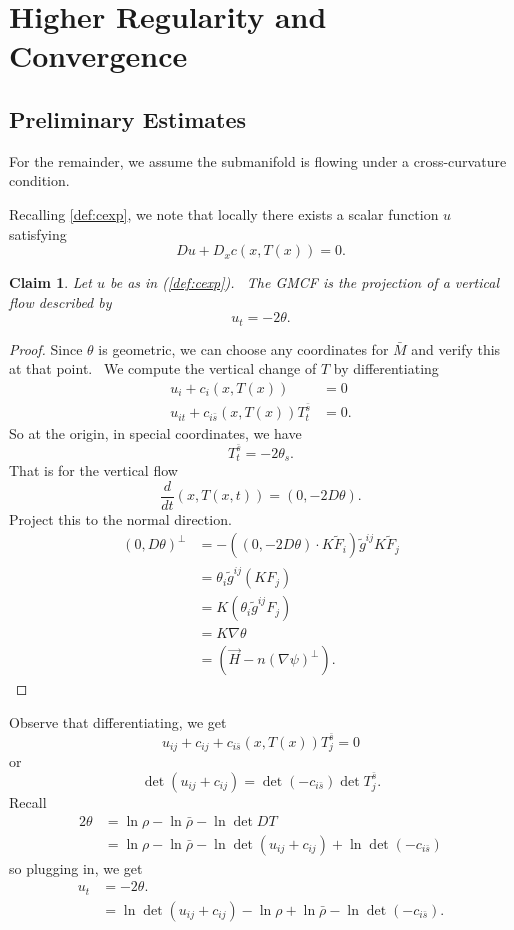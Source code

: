 \documentclass[12pt,letterpaper]{amsart}%
\newcounter{mycounter}
\numberwithin{mycounter}{section}
\theoremstyle{plain}
\newtheorem{claim}[mycounter]{Claim}
\numberwithin{equation}{section}
\theoremstyle{definition}
\begin{document}
\section{Higher Regularity and Convergence } 

\subsection{Preliminary Estimates}

For the remainder, we assume the submanifold is flowing under a cross-curvature condition.  

Recalling \eqref{def:cexp}, we note that locally there exists a scalar function $u$ satisfying
\[
Du + D_x c(x,T(x)) = 0.
\]


\begin{claim}
Let $u$ be as in (\ref{def:cexp}). \ The GMCF is the projection of a
vertical flow described by
\[
u_{t}=-2\theta.
\]

\end{claim}

\begin{proof}
Since $\theta$ is geometric, we can choose any coordinates for $\bar{M}$ and
verify this at that point. \ We compute the vertical change of $T$ by
differentiating \
\begin{align*}
u_{i}+c_{i}(x,T(x))  & =0\\
u_{it}+c_{i\bar{s}}(x,T(x))T_{t}^{\bar{s}}  & =0.
\end{align*}
So at the origin, in special coordinates, we have
\[
T_{t}^{\bar{s}}=-2\theta_{s}.
\]
That is for the vertical flow
\[
\frac{d}{dt}(x,T(x,t))=(0,-2D\theta).
\]
Project this to the normal direction. \
\begin{align*}
(0,D\theta)^{\perp}  & =-\left(  (0,-2D\theta)\cdot K\tilde{F}_{i}\right)
\tilde{g}^{ij}K\tilde{F}_{j}\\
& =\theta_{i}\tilde{g}^{ij}(KF_{j})\\
& =K\left(  \theta_{i}\tilde{g}^{ij}F_{j}\right)  \\
& =K\nabla\theta\\
& =(\vec{H}-n\left(  \nabla\psi\right)  ^{\perp}).
\end{align*}

\end{proof}

Observe that differentiating, we get
\begin{equation}
u_{ij}+c_{ij}+c_{i\bar{s}}(x,T(x))T_{j}^{\bar{s}}=0 \label{c2c1}
\end{equation}
or
\[
\det(u_{ij}+c_{ij})=\det(-c_{i\bar{s}})\det T_{j}^{\bar{s}}.
\]
Recall
\begin{align*}
2\theta & =\ln\rho-\ln\bar{\rho}-\ln\det DT\\
& =\ln\rho-\ln\bar{\rho}-\ln\det(u_{ij}+c_{ij})+\ln\det(-c_{i\bar{s}})
\end{align*}
so plugging in, we get
\begin{align*}
u_{t}  & =-2\theta.\\
& =\ln\det(u_{ij}+c_{ij})-\ln\rho+\ln\bar{\rho}-\ln\det(-c_{i\bar{s}}).
\end{align*}
\end{document}
